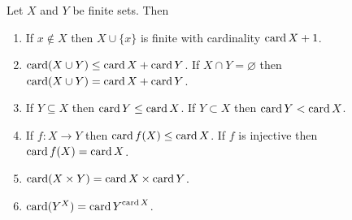 \begin{prop}\label{c2s6p3}
Let $X$ and $Y$ be finite sets. Then
\begin{enumerate}
\item If $x \notin X$ then $X \cup \{x\}$ is finite with cardinality $\operatorname{card}
X + 1$.
\item $\operatorname{card}(X \cup Y) \le \operatorname{card} X + \operatorname{card} Y$. If $X \cap Y = \varnothing$
then $\operatorname{card}(X \cup Y) = \operatorname{card} X + \operatorname{card} Y$.
\item If $Y \subseteq X$ then $\operatorname{card} Y \le \operatorname{card} X$. If $Y \subset X$ then
$\operatorname{card} Y < \operatorname{card} X$.
\item If $f: X \rightarrow Y$ then $\operatorname{card} f(X) \le \operatorname{card} X$. If $f$ is
injective then $\operatorname{card} f(X) = \operatorname{card} X$.
\item $\operatorname{card}(X \times Y) = \operatorname{card} X \times \operatorname{card} Y$.
\item $\operatorname{card}(Y^X) = {\operatorname{card} Y}^{\operatorname{card} X}$.
\end{enumerate}
\end{prop}
